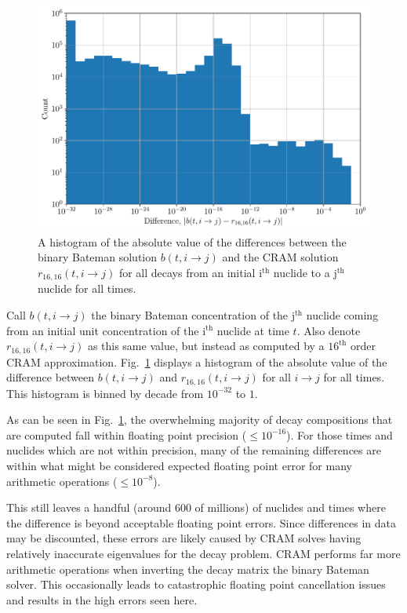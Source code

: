 \documentclass[letterpaper]{physor2018}
\newcommand{\ith}{i$^{\mathrm{th}}$\xspace}
\newcommand{\jth}{j$^{\mathrm{th}}$\xspace}
\begin{document}
\begin{figure}[!htb]
  \centering
  \includegraphics[scale=0.80]{./diff-hist.pdf}
  \caption{A histogram of the absolute value of the differences between the
           binary Bateman solution $b(t, i\to j)$
           and the CRAM solution  $r_{16,16}(t, i\to j)$ for all decays
           from an initial \ith nuclide to a \jth nuclide for all times.}
  \label{fig-diff-hist}
\end{figure}

Call $b(t, i\to j)$ the binary Bateman concentration of the \jth nuclide
coming from an initial unit concentration of the \ith nuclide at time $t$.
Also denote $r_{16,16}(t, i\to j)$ as this same value, but instead as computed
by a $16^{\mathrm{th}}$ order CRAM approximation. Fig.~\ref{fig-diff-hist}
displays a histogram of the absolute value of the difference between
$b(t, i\to j)$ and $r_{16,16}(t, i\to j)$ for all $i \to j$ for all times.
This histogram is binned by decade from $10^{-32}$ to $1$.

As can be seen in Fig.~\ref{fig-diff-hist}, the overwhelming majority of
decay compositions that are computed fall within floating point precision
($\le 10^{-16}$). For those times and nuclides which are not within precision,
many of the remaining differences are within what might be considered
expected floating point error for many arithmetic operations ($\le 10^{-8}$).

This still leaves a handful (around 600 of millions) of nuclides and times
where the difference is beyond acceptable floating point errors. Since differences
in data may be discounted, these errors are likely caused by CRAM solves
having relatively inaccurate eigenvalues for the decay problem. CRAM performs
far more arithmetic operations when inverting the decay matrix the binary Bateman
solver. This occasionally leads to catastrophic floating point cancellation
issues and results in the high errors seen here.
\end{document}
